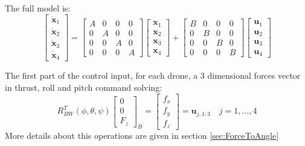 \documentclass[a4paper, 12pt]{report}
\newcommand\norm[1]{\left\lVert#1\right\rVert}
\begin{document}
The full model is:
\[\begin{bmatrix}\boldsymbol{\dot x}_1 \\ \boldsymbol{\dot x}_2 \\ \boldsymbol{\dot x}_3 \\ \boldsymbol{\dot x}_4\end{bmatrix}  = 
\begin{bmatrix}  A & 0 & 0 & 0 \\ 0 & A & 0 & 0 \\ 0 & 0 & A & 0 \\ 0 & 0 & 0 & A \end{bmatrix} 
\begin{bmatrix}\boldsymbol{x}_1 \\ \boldsymbol{x}_2 \\ \boldsymbol{x}_3 \\ \boldsymbol{x}_4\end{bmatrix}  + 
\begin{bmatrix}  B & 0 & 0 & 0 \\ 0 & B & 0 & 0 \\ 0 & 0 & B & 0 \\ 0 & 0 & 0 & B \end{bmatrix} 
\begin{bmatrix}\boldsymbol{u}_1 \\ \boldsymbol{u}_2 \\ \boldsymbol{u}_3 \\ \boldsymbol{u}_4\end{bmatrix} \]

The first part of the control input, for each drone, a 3 dimensional forces vector in thrust, roll and pitch command solving:
\[ R_{BW}^T(\phi, \theta, \psi) \begin{bmatrix}  0\\ 0\\ F_z \end{bmatrix}_B = \begin{bmatrix}  f_x\\ f_y\\ f_z \end{bmatrix} = \boldsymbol{u}_{j,1:3} \quad j = 1, \ldots , 4\]
More details about this operations are given in section \ref{sec:ForceToAngle}

%
\end{document}
